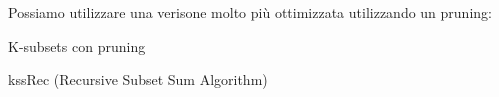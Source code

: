 Possiamo utilizzare una verisone molto più ottimizzata utilizzando un pruning:
\vskip3mm
\begin{algoritmo}{K-subsets con pruning}
	\begin{algorithm}[H]
		\caption{kssRec (Recursive Subset Sum Algorithm)}
	\end{algorithm}
\end{algoritmo}

